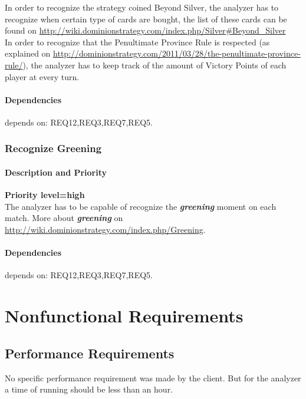 \documentclass{scrreprt}
\begin{document}
In order to recognize the strategy coined Beyond Silver, the analyzer has to recognize when certain type of cards are bought, the list of these cards can be found on \url{http://wiki.dominionstrategy.com/index.php/Silver#Beyond_Silver}\\

In order to recognize that the Penultimate Province Rule is respected (as explained on \url{http://dominionstrategy.com/2011/03/28/the-penultimate-province-rule/}), the analyzer has to keep track of the amount of Victory Points of each player at every turn.

\subsubsection{Dependencies}
depends on: REQ12,REQ3,REQ7,REQ5.

\subsection{Recognize Greening}
\subsubsection{Description and Priority}
\textbf{Priority level=high}\\
The analyzer has to be capable of recognize the \textit{\textbf{greening}} moment on each match.
More about \textit{\textbf{greening}} on \url{http://wiki.dominionstrategy.com/index.php/Greening}.
\subsubsection{Dependencies}
depends on: REQ12,REQ3,REQ7,REQ5.


\chapter{Nonfunctional Requirements}

\section{Performance Requirements}
No specific performance requirement was made by the client. But for the analyzer
a time of running should be less than an hour.
\end{document}
